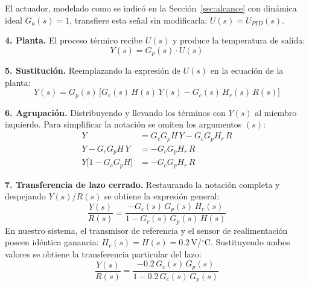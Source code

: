 \documentclass[journal,twocolumn]{IEEEtran}
\begin{document}
El actuador, modelado como se indicó en la Sección~\ref{sec:alcance} con dinámica ideal $G_a(s) = 1$, transfiere esta señal sin modificarla: $U(s) = U_{PID}(s)$.

\textbf{4. Planta.} El proceso térmico recibe $U(s)$ y produce la temperatura de salida:
\begin{equation}
    Y(s) = G_p(s) \cdot U(s)
\end{equation}

\textbf{5. Sustitución.} Reemplazando la expresión de $U(s)$ en la ecuación de la planta:
\begin{equation}
    Y(s) = G_p(s)\,\bigl[G_c(s)\,H(s)\,Y(s) - G_c(s)\,H_r(s)\,R(s)\bigr]
\end{equation}

\textbf{6. Agrupación.} Distribuyendo y llevando los términos con $Y(s)$ al miembro izquierdo. Para simplificar la notación se omiten los argumentos $(s)$:
\begin{align}
    Y &= G_c G_p H\,Y - G_c G_p H_r\,R \\
    Y - G_c G_p H\,Y &= -G_c G_p H_r\,R \\
    Y\bigl[1 - G_c G_p H\bigr] &= -G_c G_p H_r\,R
\end{align}

\textbf{7. Transferencia de lazo cerrado.} Restaurando la notación completa y despejando $Y(s)/R(s)$ se obtiene la expresión general:
\begin{equation}
    \frac{Y(s)}{R(s)} = \frac{-G_c(s)\,G_p(s)\,H_r(s)}{1 - G_c(s)\,G_p(s)\,H(s)}
\end{equation}
En nuestro sistema, el transmisor de referencia y el sensor de realimentación poseen idéntica ganancia: $H_r(s) = H(s) = 0.2$\,V/$^\circ$C. Sustituyendo ambos valores se obtiene la transferencia particular del lazo:
\begin{equation}
    \frac{Y(s)}{R(s)} = \frac{-0.2\,G_c(s)\,G_p(s)}{1 - 0.2\,G_c(s)\,G_p(s)}
\end{equation}
\end{document}
